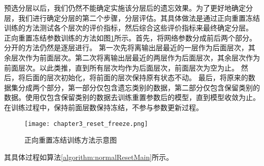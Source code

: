 预选分层以后，我们仍然不能确定实施该分层后的遗忘效果。为了更好地确定分层，我们进行确定分层的第二个步骤，分层评估。其具体做法是通过正向重置冻结训练的方法测试各个层次的评价指标，然后综合这些评价指标来最终确定分层。
正向重置冻结参数训练的方法如图\ref{fig:chapter3_reset_freeze}所示。首先，将网络参数分成前后两个部分。分开的方法仍然是逐层进行。
第一次先将离输出层最近的一层作为后面层次，其余层次作为前面层次。第二次将离输出层最近的两层作为后面层次，其余层次作为前面层次。以此类推，直到所有层次均作为后面层次，前面层次为空为止。
然后，将后面的层次初始化，将前面的层次保持原有状态不动。
最后，将原来的数据集分成两个部分，第一部分仅包含遗忘类别的数据，第二部分仅包含保留类别的数据。使用仅包含保留类别的数据去训练重置参数后的模型，直到模型收敛为止。在训练过程中，保持前面层数保持冻结，不参与参数更新过程。
\begin{figure}
    \centering
    \texttt{[image: chapter3\_reset\_freeze.png]}
    \caption{正向重置冻结训练方法示意图}
    \label{fig:chapter3_reset_freeze}
\end{figure}
其具体过程如算法\ref{algorithm:normalResetMain}所示。
